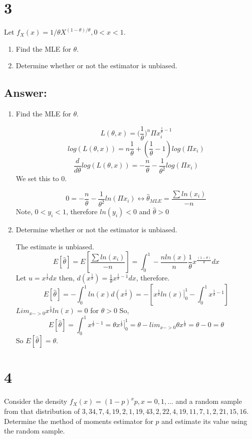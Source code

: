 \documentclass[svgnames]{article}
\begin{document}
\section*{3}
Let $f_X(x) = 1/\theta X^{(1-\theta)/\theta}, 0 < x <1$. 

\begin{enumerate}[label=\roman*.]
\item Find the MLE for $\theta$. 
\item Determine whether or not the estimator is unbiased.
\end{enumerate}

\subsection*{Answer:}

\begin{enumerate}[label=\roman*.]
\item Find the MLE for $\theta$. 

$$L(\theta, x) = \big( \frac{1}{\theta}\big)^n \Pi x_i^{\frac{1}{\theta}-1} $$
$$log(L(\theta, x))= n \frac{1}{\theta} + (\frac{1}{\theta}-1)log(\Pi x_i)$$
$$\frac{d}{d\theta}log(L(\theta, x)) = -\frac{n}{\theta} -\frac{1}{\theta^2}log(\Pi x_i)$$
We set this to 0.

$$0 = -\frac{n}{\theta} -\frac{1}{\theta^2}ln(\Pi x_i) \leftrightarrow  \hat{\theta}_{MLE} = \frac{\sum ln( x_i)}{-n}$$
Note, $0<y_i<1$, therefore $ln(y_i)< 0$ and $\hat{\theta}>0$
\item Determine whether or not the estimator is unbiased.

The estimate is unbiased.
$$E[\hat{\theta}] =E[\frac{\sum ln( x_i)}{-n}]=\int_{0}^{1}-\frac{n ln(x)}{n}\frac{1}{\theta}x^{\frac{(1-\theta)}{\theta}}dx$$
Let $u=x^{\frac{1}{\theta}}dx$ then, $d(x^{\frac{1}{\theta}})= \frac{1}{\theta}x^{\frac{1}{\theta}-1}dx$, therefore.
$$E[\hat{\theta}] = -\int^{1}_{0}ln(x)d(x^{\frac{1}{\theta}})= -[x^{\frac{1}{\theta}}ln(x)\bar|^{1}_{0} - \int_{0}^{1}x^{\frac{1}{\theta}-1}]$$
$Lim_{x ->0}x^{\frac{1}{\theta}}ln(x)=0$ for $\theta>0$ So,
$$E[\hat{\theta}]=\int_{0}^{1}x^{\frac{1}{\theta}-1}=\theta x^{\frac{1}{\theta}}\bar|^{1}_{0}=\theta - lim_{x->0}\theta x^{\frac{1}{\theta}}=\theta-0=\theta$$
So $E[\hat{\theta}]=\theta$.
\end{enumerate}

\section*{4}
Consider the density $f_X(x) = (1-p)^x p, x= 0, 1, ...$ and a random sample from that distribution of ${3, 34, 7, 4, 19, 2, 1, 19, 43, 2, 22, 4, 19, 11, 7, 1, 2, 21, 15, 16}$. Determine the method of moments estimator for $p$ and estimate its value using the random sample.
\end{document}
